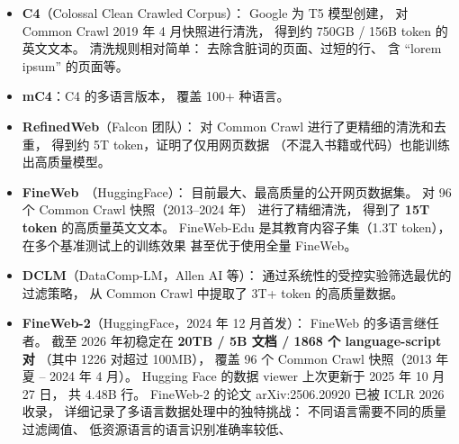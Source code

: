 \begin{itemize}[noitemsep]
  \item \textbf{C4}（Colossal Clean Crawled Corpus）：
        Google 为 T5 模型创建，
        对 Common Crawl 2019 年 4 月快照进行清洗，
        得到约 750GB / 156B token 的英文文本。
        清洗规则相对简单：
        去除含脏词的页面、过短的行、
        含 “lorem ipsum” 的页面等。
  \item \textbf{mC4}：C4 的多语言版本，
        覆盖 100+ 种语言。
  \item \textbf{RefinedWeb}（Falcon 团队）：
        对 Common Crawl 进行了更精细的清洗和去重，
        得到约 5T token，证明了仅用网页数据
        （不混入书籍或代码）也能训练出高质量模型。
  \item \textbf{FineWeb}~\cite{penedo2024fineweb}（HuggingFace）：
        目前最大、最高质量的公开网页数据集。
        对 96 个 Common Crawl 快照（2013--2024 年）
        进行了精细清洗，
        得到了 \textbf{15T token} 的高质量英文文本。
        FineWeb-Edu 是其教育内容子集（1.3T token），
        在多个基准测试上的训练效果
        甚至优于使用全量 FineWeb。
  \item \textbf{DCLM}（DataComp-LM，Allen AI 等）：
        通过系统性的受控实验筛选最优的过滤策略，
        从 Common Crawl 中提取了 3T+ token 的高质量数据。
  \item \textbf{FineWeb-2}（HuggingFace，2024 年 12 月首发）：
        FineWeb 的多语言继任者。
        截至 2026 年初稳定在
        \textbf{20TB / 5B 文档 / 1868 个 language-script 对}
        （其中 1226 对超过 100MB），
        覆盖 96 个 Common Crawl 快照（2013 年夏 -- 2024 年 4 月）。
        Hugging Face 的数据 viewer 上次更新于 2025 年 10 月 27 日，
        共 4.48B 行。
        FineWeb-2 的论文 arXiv:2506.20920 已被 ICLR 2026 收录，
        详细记录了多语言数据处理中的独特挑战：
        不同语言需要不同的质量过滤阈值、
        低资源语言的语言识别准确率较低、

\end{itemize}

